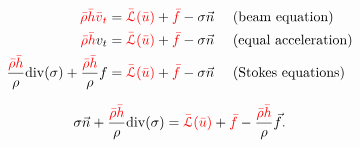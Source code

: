\documentclass[
paperwidth=48in,paperheight=36in,
fontscale=0.4
]{baposter}
\begin{document}
\begin{poster}
{\begin{align*}
    {\color{red} \bar{\rho}} {\color{red} \bar{h}} {\color{red} \bar{v}}_{{\color{red}t}}
    &= {\color{red} \bar{\mathcal{L}}(\bar{u})} + {\color{red} \bar{f}} - \sigma \vec{n}
    \quad \text{ (beam equation)}                                             \\
    {\color{red} \bar{\rho}} {\color{red} \bar{h}} v_t
    &= {\color{red} \bar{\mathcal{L}}(\bar{u})} + {\color{red} \bar{f}} - \sigma \vec{n}
    \quad \text{ (equal acceleration)}                                        \\
    \dfrac{{\color{red} \bar{\rho}} {\color{red} \bar{h}}}{\rho} \mathrm{div}(\sigma)
    + \dfrac{{\color{red} \bar{\rho}} {\color{red} \bar{h}}}{\rho} f
    &= {\color{red} \bar{\mathcal{L}}(\bar{u})} + {\color{red} \bar{f}} - \sigma \vec{n}
    \quad \text{ (Stokes equations)}
\end{align*}

\begin{equation*}
    \sigma \vec{n} + \dfrac{{\color{red} \bar{\rho}} {\color{red} \bar{h}}}{\rho} \mathrm{div}(\sigma)
    = {\color{red} \bar{\mathcal{L}}(\bar{u})}
    + {\color{red} \bar{f}}
    - \dfrac{{\color{red} \bar{\rho}} {\color{red} \bar{h}}}{\rho} \vec{f}.
\end{equation*}

\phantom{A}
}


\end{poster}
\end{document}

